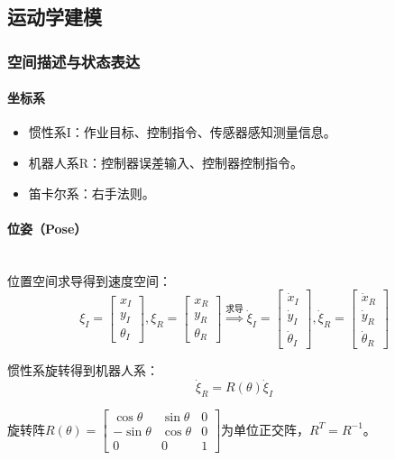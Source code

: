 \documentclass[
12pt, %
a4paper, 
oneside, %
headinclude,footinclude, %
]{scrartcl}
\begin{document}
\subsection[运动学建模]{运动学建模}
\subsubsection[空间描述与状态表达]{空间描述与状态表达}
\paragraph{坐标系}
\begin{itemize}
\item 惯性系I：作业目标、控制指令、传感器感知测量信息。
\item 机器人系R：控制器误差输入、控制器控制指令。
\item 笛卡尔系：右手法则。
\end{itemize}
\paragraph{位姿（Pose）}~\\

位置空间求导得到速度空间：
$$
\xi_I = \begin{bmatrix} x_I \\ y_I \\ \theta_I \end{bmatrix}, \xi_R = \begin{bmatrix} x_R \\ y_R \\ \theta_R \end{bmatrix}
\overset{\text{求导}}{\Longrightarrow}
\dot{\xi}_I = \begin{bmatrix} \dot{x}_I \\ \dot{y}_I \\ \dot{\theta}_I \end{bmatrix}, \dot{\xi}_R = \begin{bmatrix} \dot{x}_R \\ \dot{y}_R \\ \dot{\theta}_R \end{bmatrix}
$$

惯性系旋转得到机器人系：
$$ \dot{\xi}_R = R(\theta) \dot{\xi}_I $$

旋转阵$ R(\theta) = \begin{bmatrix} \cos\theta & \sin\theta & 0 \\ -\sin\theta & \cos\theta & 0 \\ 0 & 0 & 1 \end{bmatrix} $为单位正交阵，$ R^T = R^{-1} $。
\end{document}

